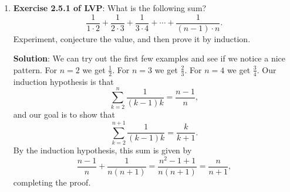 \documentclass[11pt]{article}
\begin{document}
\begin{enumerate}
\begin{enumerate}
{\bf Solution}: We see that 
\[
f'(p_1) = -2 p_1 + (1-p_3 - p_4-\cdots - p_n),
\]
so $f'(p_1) = 0$ implies that $p_1 = p_2 = \frac{1-p_3-\cdots - p_n}{2}$.  Again, taking a second derivative shows that this is a maximum.

For any fixed $p_3,\ldots, p_n$ the function increases as $p_1$ and $p_2$ come together, so this gives the absolute maximum.


\item Using the previous result, show that the uniform distribution, where each $p_i = \frac{1}{n}$ maximizes the probability that our two people do not share the same birthday.


{\bf Solution}:  The fact that we used $p_1$ and $p_2$ in the two steps above is not so important.  Given any $(i,j)$ with $1\le i < j \le n$, we can think of every other $p_k$ being fixed and then write $p_j$ as a linear function of $p_i$.  We now think of $f(p_i)$ as a function of a single variable, in fact, it gives a concave-down parabola.  Taking a derivative shows that this function increases as $p_i$ and $p_j$ come together.

Now suppose that there is some set of values $(p_1,p_2,\ldots, p_n)$ maximizing $f(p_1,\ldots, p_n)$.  We claim that $p_1 = p_2 = \cdots = p_n = \frac{1}{n}$.

We argue by contradiction.  Suppose that the maximum value of $f(p_1,\ldots, p_n)$ is not given by the case where each $p_i$ is equal.  So, for this $(a_1,\ldots, a_n)$ giving the maximum value, there exists a pair $(j,k)$ with $1\le j < k \le n$ and $a_j \neq a_k$.  Part (b) shows that if we make  $a_j$ and $a_k$ ``come together'', then the value of $f(p_1,\ldots, p_n)$ increases, contradicting the assumption that $(a_1,a_2,\ldots, a_n)$ is where the function is maximized.  Therefore, the maximum value does come from the case where each $p_i = \frac{1}{n}$.



\end{enumerate}

\item {\bf Exercise 2.5.1 of LVP}: What is the following sum?
\[
\frac{1}{1\cdot 2}+\frac{1}{2\cdot 3} +\frac{1}{3\cdot 4} + \cdots + \frac{1}{(n-1)\cdot n}.
\]
Experiment, conjecture the value, and then prove it by induction.

{\bf Solution}:  We can try out the first few examples and see if we notice a nice pattern.  For $n=2$ we get $\frac{1}{2}$. For $n=3$ we get $\frac{2}{3}$. For $n = 4$ we get $\frac{3}{4}$.  Our induction hypothesis is that 
\[
\sum_{k=2}^n \frac{1}{(k-1)k} = \frac{n-1}{n},
\]
and our goal is to show that 
\[
\sum_{k=2}^{n+1} \frac{1}{(k-1)k} = \frac{k}{k+1}.
\]
By the induction hypothesis, this sum is given by
\[
\frac{n-1}{n} + \frac{1}{n(n+1)} = \frac{n^2-1 + 1}{n(n+1)} = \frac{n}{n+1},
\]
completing the proof.



\end{enumerate}
\end{document}
